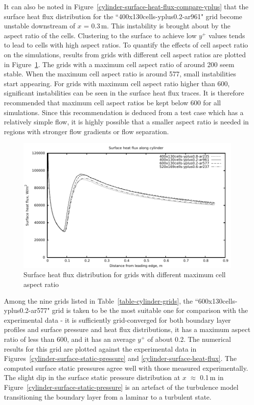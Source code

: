 It can also be noted in Figure~\ref{cylinder-surface-heat-flux-compare-yplus} that 
the surface heat flux distribution for the ``400x130cells-yplus0.2-ar961" grid 
become unstable downstream of $x$ = 0.3\,m. This instability is brought about by 
the aspect ratio of the cells. Clustering to the surface to achieve low
$y^+$ values tends to lead to cells with high aspect ratios. To quantify the
effects of cell aspect ratio on the simulations, results from grids with different
cell aspect ratios are plotted in Figure~\ref{cylinder-surface-heat-flux-compare-aspect-ratio}.
The grids with a maximum cell aspect ratio of around 200 seem stable. When the 
maximum cell aspect ratio is around 577, small instabilities start appearing. For
grids with maximum cell aspect ratio higher than 600, significant instabilities
can be seen in the surface heat flux traces. It is therefore recommended that
maximum cell aspect ratios be kept below 600 for all simulations. Since this
recommendation is deduced from a test case which has a relatively simple flow,
it is highly possible that a smaller aspect ratio is needed in regions with 
stronger flow gradients or flow separation.
%
\begin{figure}[h]
 \begin{center}
  \includegraphics[width=15cm]{./chap3-mallinson-cylinder/figs/compare-aspect-ratio-heat-flux.pdf}
 \end{center}
 \caption{Surface heat flux distribution for grids with different maximum cell aspect ratio}
 \label{cylinder-surface-heat-flux-compare-aspect-ratio}
\end{figure}

Among the nine grids listed in Table~\ref{table-cylinder-grids}, the 
``600x130cells-yplus0.2-ar577" grid is taken to be the most suitable
one for comparison with the experimental data - it is sufficiently 
grid-converged for both boundary layer profiles and surface pressure 
and heat flux distributions, it has a maximum aspect ratio of less
than 600, and it has an average $y^+$ of about 0.2. The numerical results
for this grid are plotted against the experimental data in 
Figures~\ref{cylinder-surface-static-pressure} and \ref{cylinder-surface-heat-flux}.
The computed surface static pressures agree well with those measured experimentally. 
The slight dip in the surface static pressure distribution at $x$ $\approx$ 0.1\,m 
in Figure~\ref{cylinder-surface-static-pressure} is an artefact of the 
turbulence model transitioning the boundary layer from a laminar to a turbulent 
state. 

